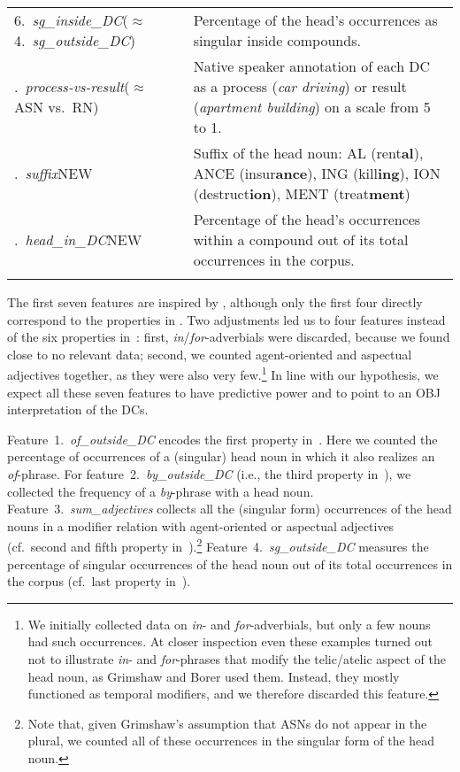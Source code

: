 \documentclass[output=paper]{langsci/langscibook}
\begin{document}
\begin{table}
\begin{tabularx}{\textwidth}{p{3.25cm}Q}
6.\ \textit{sg\_inside\_DC}\newline($\approx$ 4.~\textit{sg\_outside\_DC}) & Percentage of the head's occurrences as singular inside compounds.\\.\ \textit{process-vs-result}\newline($\approx$ ASN vs.~RN) & Native speaker annotation of each DC as a process (\textit{car driving}) or result (\textit{apartment building})  on a scale from 5 to 1.\\.\ \textit{suffix}\newline NEW & Suffix of the head noun: AL (rent\textbf{al}), ANCE (insur\textbf{ance}), ING (kill\textbf{ing}), ION (destruct\textbf{ion}), MENT (treat\textbf{ment})\\.\ \textit{head\_in\_DC}\newline NEW & Percentage of the head's occurrences within a compound out of its total occurrences in the corpus.\\ \lspbottomrule
\end{tabularx}
\end{table}


The first seven features are inspired by \cite{grimshaw:90},  {although only the first four directly correspond to the properties in . Two adjustments led us to four features instead of the six properties in~: first, \textit{in}/\textit{for}-adverbials were discarded, because we found close to no relevant data; second, we counted agent-oriented and aspectual adjectives together, as they were also very few.}\footnote{We initially collected data on \textit{in}- and \textit{for}-adverbials, but only a few nouns had such occurrences. At closer inspection even these examples turned out not to illustrate \textit{in}- and \textit{for}-phrases that modify the telic/atelic aspect of the head noun, as Grimshaw and Borer used them. Instead, they mostly functioned as temporal modifiers, and we therefore discarded this feature.}  In line with our hypothesis, we expect all these seven features to have predictive power and to point to an OBJ interpretation of the DCs.

Feature~1.~\textit{of\_outside\_DC} encodes the first property in~. Here we counted the percentage of occurrences of a (singular) head noun in which it also realizes an  \textit{of}-phrase. For feature~2.~\textit{by\_outside\_DC} (i.e., the third property in~), we collected the frequency of a \textit{by}-phrase with a head noun. 
 Feature~3.~\textit{sum\_adjectives} collects all the (singular form) occurrences of the head nouns in a modifier relation with agent-oriented or aspectual adjectives (cf.~second and fifth property in~).\footnote{Note that, given Grimshaw's assumption that ASNs do not appear in the plural, we counted all of these occurrences in the singular form of the head noun.} Feature~4.~\textit{sg\_outside\_DC} measures the percentage of singular occurrences of the head noun out of its total occurrences in the corpus  {(cf.~last property in~)}. 
\end{document}
